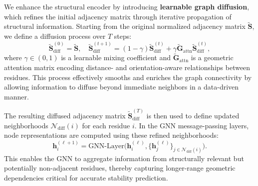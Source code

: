 \documentclass[11pt]{article}
\begin{document}
We enhance the structural encoder by introducing \textbf{learnable graph diffusion}, which refines the initial adjacency matrix through iterative propagation of structural information. Starting from the original normalized adjacency matrix $\mathbf{\tilde{S}}$, we define a diffusion process over $T$ steps:
\begin{equation}
    \mathbf{\tilde{S}}_{\text{diff}}^{(0)} = \mathbf{\tilde{S}}, \quad
    \mathbf{\tilde{S}}_{\text{diff}}^{(t+1)} = (1 - \gamma) \mathbf{\tilde{S}}_{\text{diff}}^{(t)} + \gamma \mathbf{\tilde{G}}_{\text{attn}} \mathbf{\tilde{S}}_{\text{diff}}^{(t)},
\end{equation}
where $\gamma \in (0,1)$ is a learnable mixing coefficient and $\mathbf{\tilde{G}}_{\text{attn}}$ is a geometric attention matrix encoding distance- and orientation-aware relationships between residues. This process effectively smooths and enriches the graph connectivity by allowing information to diffuse beyond immediate neighbors in a data-driven manner.

The resulting diffused adjacency matrix $\mathbf{\tilde{S}}_{\text{diff}}^{(T)}$ is then used to define updated neighborhoods $\mathcal{N}_{\text{diff}}(i)$ for each residue $i$. In the GNN message-passing layers, node representations are computed using these refined neighborhoods:
\begin{equation}
    \mathbf{h}_i^{(\ell+1)} = \text{GNN-Layer}\big(\mathbf{h}_i^{(\ell)}, \{\mathbf{h}_j^{(\ell)}\}_{j \in \mathcal{N}_{\text{diff}}(i)}\big).
\end{equation}
This enables the GNN to aggregate information from structurally relevant but potentially non-adjacent residues, thereby capturing longer-range geometric dependencies critical for accurate stability prediction.
\end{document}
